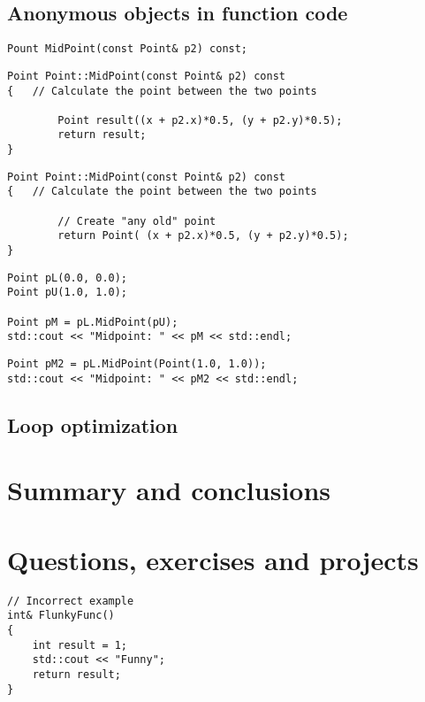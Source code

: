 \subsection{Anonymous objects in function code}

\begin{lstlisting}
Pount MidPoint(const Point& p2) const;
\end{lstlisting}

\begin{lstlisting}
Point Point::MidPoint(const Point& p2) const
{	// Calculate the point between the two points

		Point result((x + p2.x)*0.5, (y + p2.y)*0.5);
		return result;
}
\end{lstlisting}

\begin{lstlisting}
Point Point::MidPoint(const Point& p2) const
{	// Calculate the point between the two points

		// Create "any old" point
		return Point( (x + p2.x)*0.5, (y + p2.y)*0.5);
}
\end{lstlisting}

\begin{lstlisting}
Point pL(0.0, 0.0);
Point pU(1.0, 1.0);

Point pM = pL.MidPoint(pU);
std::cout << "Midpoint: " << pM << std::endl;
\end{lstlisting}

\begin{lstlisting}
Point pM2 = pL.MidPoint(Point(1.0, 1.0));
std::cout << "Midpoint: " << pM2 << std::endl;
\end{lstlisting}

\subsection{Loop optimization}

\section{Summary and conclusions}

\section{Questions, exercises and projects}

\begin{lstlisting}
// Incorrect example
int& FlunkyFunc()
{
	int result = 1;
	std::cout << "Funny";
	return result;
}
\end{lstlisting}

